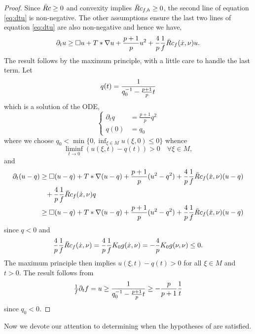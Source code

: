 \begin{proof}
Since $\-Rc \geq 0$ and convexity implies $\-Rc_{f,h} \geq 0$, the second line of equation \eqref{eq:dtu} is non-negative. The other assumptions ensure the last two lines of equation \eqref{eq:dtu} are also non-negative and hence we have,
\[
\partial_t u \geq \Box u + T \ast \nabla u + \fr{p+1}{p} u^2 + \frac{4}{p} \frac{1}{f} \-Rc_f(\dot{x}, \nu)u.
\]
The result follows by the maximum principle, with a little care to handle the last term. Let
\[
q(t) = \fr{1}{q_0^{-1} - \tfrac{p+1}{p} t}
\]
which is a solution of the ODE,
\[
\begin{cases}
\partial_t q &= \frac{p+1}{p} q^2 \\
q(0) &= q_0
\end{cases}
\]
where we choose $q_0 < \min\{0, \inf_{\xi\in M} u(\xi, 0) \leq 0\}$ whence
\[
\liminf_{t\to 0} (u(\xi, t) - q(t)) > 0 \quad \forall \xi \in M,
\]
and
\[
\begin{split}
\partial_t (u - q) &\geq \Box (u - q) + T \ast \nabla (u - q) + \fr{p+1}{p}(u^2 - q^2) + \frac{4}{p} \frac{1}{f} \-Rc_f(\dot{x}, \nu)(u - q) \\
&\hp{=} + \frac{4}{p} \frac{1}{f} \-Rc_f(\dot{x}, \nu) q \\
&\geq \Box (u - q) + T \ast \nabla (u - q) + \fr{p+1}{p}(u^2 - q^2) + \frac{4}{p} \frac{1}{f} \-Rc_f(\dot{x}, \nu)(u - q)
\end{split}
\]
since $q < 0$ and
\[
\frac{4}{p} \frac{1}{f} \-Rc_f(\dot{x}, \nu) = \frac{4}{p} \frac{1}{f} K_0 g (\dot{x}, \nu) = -\frac{4}{p} K_0 g(\nu, \nu) \leq 0.
\]
The maximum principle then implies $u(\xi, t) - q(t) > 0$ for all $\xi \in M$ and $t>0$. The result follows from
\[
\tfrac{1}{f} \partial_t f = u \geq \fr{1}{q_0^{-1} - \tfrac{p+1}{p} t} \geq - \frac{p}{p+1} \frac{1}{t}
\]
since $q_0 < 0$.
\end{proof}

Now we devote our attention to determining when the hypotheses of  are satisfied.



